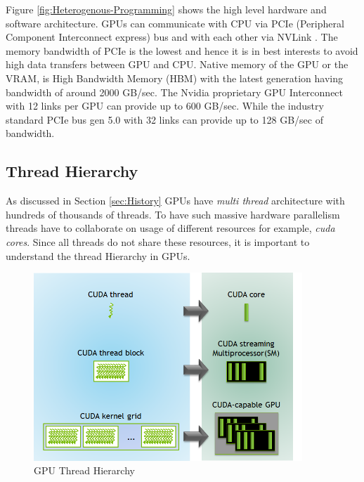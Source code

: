 Figure \ref{fig:Heterogenous-Programming} shows the high level hardware and software architecture.
GPUs can communicate with CPU via PCIe (Peripheral Component Interconnect express) bus and with each other via NVLink \texttrademark.
The memory bandwidth of PCIe is the lowest and hence it is in best interests to avoid high data transfers between GPU and CPU.
Native memory of the GPU or the VRAM, is High Bandwidth Memory (HBM) with the latest generation having bandwidth of around 2000 GB/sec.
The Nvidia proprietary GPU Interconnect with 12 links per GPU can provide up to 600 GB/sec.
While the industry standard PCIe bus gen 5.0 with 32 links can provide up to 128 GB/sec of bandwidth.

\subsection{Thread Hierarchy}\label{sec:thread-hierarchy}
As discussed in Section \ref{sec:History} GPUs have \textit{multi thread} architecture with hundreds of thousands of threads.
To have such massive hardware parallelism threads have to collaborate on usage of different resources for example, \textit{cuda cores}.
Since all threads do not share these resources, it is important to understand the thread Hierarchy in GPUs.

\begin{figure}[h]
\centering
    \includegraphics[width=0.9\textwidth]{fig/thread-hierarchy.png}
    \caption{GPU Thread Hierarchy}
    \label{fig:Thread-Hierarchy}
\end{figure}

